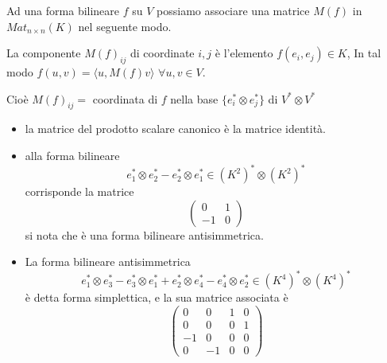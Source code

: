 \documentclass[../main.tex]{subfiles}
\begin{document}
Ad una forma bilineare $f$ su $V$ possiamo associare una matrice $M(f)$ in $Mat_{n \times n}(K)$ nel seguente modo.

La componente $M(f)_{ij}$ di coordinate $i, j$ è l'elemento $f(e_i, e_j) \in K$, In tal modo $f(u, v) = \langle u, M(f)v\rangle$ $\forall u, v \in V$.

Cioè $M(f)_{ij} =$ coordinata di $f$ nella base $\{e_i^* \otimes e_j^*\}$ di $V^* \otimes V^*$

\begin{example}
    \begin{itemize}
        \item la matrice del prodotto scalare canonico è la matrice identità.
        \item alla forma bilineare
              \begin{equation*}
                  e_1^* \otimes e_2^* - e_2^* \otimes e_1^* \in (K^2)^* \otimes (K^2)^*
              \end{equation*}
              corrisponde la matrice
              \begin{equation*}
                  \begin{pmatrix}
                      0  & 1 \\
                      -1 & 0
                  \end{pmatrix}
              \end{equation*}
              si nota che è una forma bilineare antisimmetrica.
        \item La forma bilineare antisimmetrica
              \begin{equation*}
                  e_1^* \otimes e_3^* - e_3^* \otimes e_1^* + e_2^* \otimes e_4^* - e_4^* \otimes e_2^* \in (K^4)^* \otimes (K^4)^*
              \end{equation*}
              è detta forma simplettica, e la sua matrice associata è
              \begin{equation*}
                  \begin{pmatrix}
                      0  & 0  & 1 & 0 \\
                      0  & 0  & 0 & 1 \\
                      -1 & 0  & 0 & 0 \\
                      0  & -1 & 0 & 0
                  \end{pmatrix}
              \end{equation*}
    \end{itemize}
\end{example}
\end{document}
